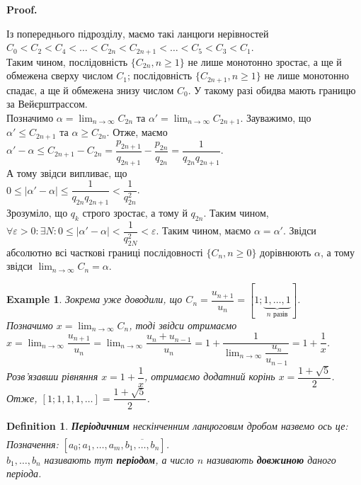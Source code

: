 \documentclass[a4paper, 14pt]{extarticle}
\makeatletter
\theoremstyle{theoremdd}
\theoremstyle{theoremdd}
\newtheorem{definition}[theorem]{Definition}
\theoremstyle{theoremdd}
\theoremstyle{theoremdd}
\newtheorem{example}[theorem]{Example}
\theoremstyle{theoremdd}
\theoremstyle{theoremdd}
\theoremstyle{theoremdd}
\theoremstyle{theoremdd}
\def\qed{$\blacksquare$}
\renewenvironment{proof}[1][Proof.\\]{\par
\pushQED{\hfill \qed}%
\normalfont \topsep6\p@\@plus6\p@\relax
\trivlist
\item\relax
{\bfseries
#1\@addpunct{.}}\hspace\labelsep\ignorespaces
}{%
\popQED\endtrivlist\@endpefalse
}
\makeatother
\begin{document}
\begin{proof}
Із попереднього підрозділу, маємо такі ланцюги нерівностей\\
$C_0 < C_2 < C_4 < \dots < C_{2n} < C_{2n+1} < \dots < C_5 < C_3 < C_1$.\\
Таким чином, послідовність $\{C_{2n}, n \geq 1\}$ не лише монотонно зростає, а ще й обмежена сверху числом $C_1$; послідовність $\{C_{2n+1}, n \geq 1\}$ не лише монотонно спадає, а ще й обмежена знизу числом $C_0$. У такому разі обидва мають границю за Вейєрштрассом. \\
Позначимо $\alpha = \displaystyle\lim_{n \to \infty} C_{2n}$ та $\alpha' = \displaystyle\lim_{n \to \infty} C_{2n+1}$. Зауважимо, що $\alpha' \leq C_{2n+1}$ та $\alpha \geq C_{2n}$. Отже, маємо\\
$\alpha' - \alpha \leq C_{2n+1} - C_{2n} = \dfrac{p_{2n+1}}{q_{2n+1}} - \dfrac{p_{2n}}{q_{2n}} = \dfrac{1}{q_{2n}q_{2n+1}}$.\\
А тому звідси випливає, що\\
$0 \leq |\alpha'-\alpha| \leq \dfrac{1}{q_{2n}q_{2n+1}} < \dfrac{1}{q_{2n}^2}$.\\
Зрозуміло, що $q_k$ строго зростає, а тому й $q_{2n}$. Таким чином, $\forall \varepsilon > 0: \exists N: 0 \leq |\alpha'-\alpha| < \dfrac{1}{q_{2N}^2} < \varepsilon$. Таким чином, маємо $\alpha = \alpha'$. Звідси абсолютно всі часткові границі послідовності $\{C_n, n \geq 0\}$ дорівнюють $\alpha$, а тому звідси $\displaystyle\lim_{n \to \infty} C_n = \alpha$.
\end{proof}

\begin{example}
Зокрема уже доводили, що $C_n = \dfrac{u_{n+1}}{u_n} = [1;\underbrace{1,\dots,1}_{n \text{ разів}}]$.\\
Позначимо $x = \displaystyle\lim_{n \to \infty} C_n$, тоді звідси отримаємо\\
$x = \displaystyle\lim_{n \to \infty} \dfrac{u_{n+1}}{u_n} = \lim_{n \to \infty} \dfrac{u_n+u_{n-1}}{u_n} = 1 + \dfrac{1}{\displaystyle\lim_{n \to \infty} \dfrac{u_n}{u_{n-1}}} = 1 + \dfrac{1}{x}$.\\
Розв'язавши рівняння $x = 1 + \dfrac{1}{x}$, отримаємо додатний корінь $x = \dfrac{1+ \sqrt{5}}{2}$.\\
Отже, $[1;1,1,1,\dots] = \dfrac{1+\sqrt{5}}{2}$.
\end{example}

\begin{definition}
\textbf{Періодичним} нескінченним ланцюговим дробом назвемо ось це:
\begin{align*}
[a_0; a_1,\dots,a_m,b_1,\dots,b_n,b_1,\dots,b_n,b_1,\dots,b_n,\dots]
\end{align*}
Позначення: $[a_0;a_1,\dots,a_m, \overline{b_1,\dots,b_n}]$.\\
$b_1,\dots,b_n$ називають тут \textbf{періодом}, а число $n$ називають \textbf{довжиною} даного періода.
\end{definition}
\end{document}
